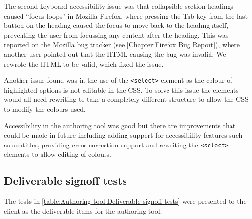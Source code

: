 The second keyboard accessibility issue was that collapsible section headings caused ``focus loops'' in Mozilla Firefox, where pressing the Tab key from the last button on the heading caused the focus to move back to the heading itself, preventing the user from focussing any content after the heading. This was reported on the Mozilla bug tracker \citep{FirefoxFocusLoopBug} (see \autoref{Chapter:Firefox Bug Report}), where another user pointed out that the HTML causing the bug was invalid. We rewrote the HTML to be valid, which fixed the issue.

Another issue found was in the use of the \texttt{\textless select\textgreater} element as the colour of highlighted options is not editable in the \gls{CSS}. To solve this issue the elements would all need rewriting to take a completely different structure to allow the \gls{CSS} to modify the colours used.

Accessibility in the authoring tool was good but there are improvements that could be made in future including adding support for accessibility features such as subtitles, providing error correction support and rewriting the \texttt{\textless select\textgreater} elements to allow editing of colours.

\subsection{Deliverable signoff tests}

The tests in \autoref{table:Authoring tool Deliverable signoff tests} were presented to the client as the deliverable items for the authoring tool.

